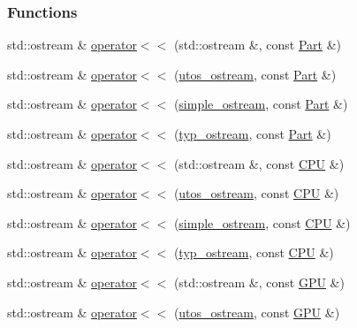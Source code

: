 \subsubsection*{Functions}
\begin{DoxyCompactItemize}
\item 
std\+::ostream \& \mbox{\hyperlink{_parts_8h_a41bf212a0001ee2061948fe863a2295b}{operator$<$$<$}} (std\+::ostream \&, const \mbox{\hyperlink{class_part}{Part}} \&)
\item 
std\+::ostream \& \mbox{\hyperlink{_parts_8h_a386ca228c4aa707c208d57d17150c7b4}{operator$<$$<$}} (\mbox{\hyperlink{structutos__ostream}{utos\+\_\+ostream}}, const \mbox{\hyperlink{class_part}{Part}} \&)
\item 
std\+::ostream \& \mbox{\hyperlink{_parts_8h_a83b50732b2aaf6def6c01031274e685b}{operator$<$$<$}} (\mbox{\hyperlink{structsimple__ostream}{simple\+\_\+ostream}}, const \mbox{\hyperlink{class_part}{Part}} \&)
\item 
std\+::ostream \& \mbox{\hyperlink{_parts_8h_ada93c35056b9f0c1829103581a945c0b}{operator$<$$<$}} (\mbox{\hyperlink{structtyp__ostream}{typ\+\_\+ostream}}, const \mbox{\hyperlink{class_part}{Part}} \&)
\item 
std\+::ostream \& \mbox{\hyperlink{_parts_8h_a63166a2a7d326683af5fc64dfaa7aa65}{operator$<$$<$}} (std\+::ostream \&, const \mbox{\hyperlink{class_c_p_u}{C\+PU}} \&)
\item 
std\+::ostream \& \mbox{\hyperlink{_parts_8h_acf2a8ceec2f59d545bb3775d65045fd2}{operator$<$$<$}} (\mbox{\hyperlink{structutos__ostream}{utos\+\_\+ostream}}, const \mbox{\hyperlink{class_c_p_u}{C\+PU}} \&)
\item 
std\+::ostream \& \mbox{\hyperlink{_parts_8h_add559a3d7b74de680540472a7687b6bd}{operator$<$$<$}} (\mbox{\hyperlink{structsimple__ostream}{simple\+\_\+ostream}}, const \mbox{\hyperlink{class_c_p_u}{C\+PU}} \&)
\item 
std\+::ostream \& \mbox{\hyperlink{_parts_8h_a1ab0478a0bdeb9282052d01315ef936e}{operator$<$$<$}} (\mbox{\hyperlink{structtyp__ostream}{typ\+\_\+ostream}}, const \mbox{\hyperlink{class_c_p_u}{C\+PU}} \&)
\item 
std\+::ostream \& \mbox{\hyperlink{_parts_8h_a0de289ccec7d8750e588f0a5761252b0}{operator$<$$<$}} (std\+::ostream \&, const \mbox{\hyperlink{class_g_p_u}{G\+PU}} \&)
\item 
std\+::ostream \& \mbox{\hyperlink{_parts_8h_a78778b576ee140cb8a81c35d0abf9716}{operator$<$$<$}} (\mbox{\hyperlink{structutos__ostream}{utos\+\_\+ostream}}, const \mbox{\hyperlink{class_g_p_u}{G\+PU}} \&)

\end{DoxyCompactItemize}
